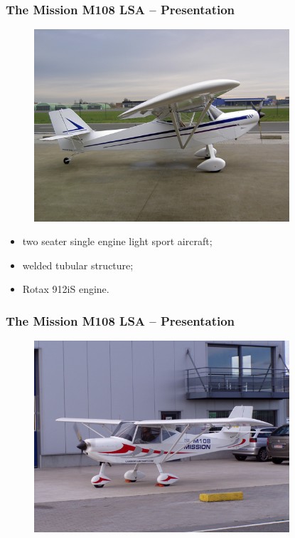 \documentclass{beamer}
\begin{document}
\begin{frame}\frametitle{The Mission M108 LSA -- Presentation}

\begin{figure}[ht!]
	\begin{center}
		\includegraphics[width=9.5cm, trim = 0cm 2.5cm 0cm 2.5cm,clip]{pics/M108.JPG}
		\label{fig:M108}
	\end{center}
\end{figure}

  \begin{itemize}
    \item two seater single engine light sport aircraft;
    \item welded tubular structure;
    \item Rotax 912iS engine.
  \end{itemize}
\end{frame}

\begin{frame}\frametitle{The Mission M108 LSA -- Presentation}
\begin{figure}[ht!]
	\begin{center}
		\includegraphics[width=9.5cm, trim = 0cm 1cm 0cm 1cm,clip]{pics/M108BIS.JPG}
		\label{fig:M108BIS}
	\end{center}
\end{figure}
\end{frame}
\end{document}

